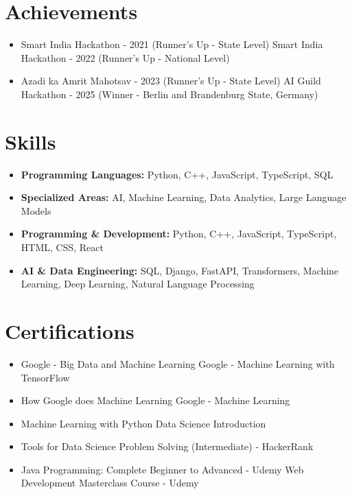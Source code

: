 \documentclass[a4paper,10pt]{article}
\begin{document}
\section*{Achievements}
\begin{itemize}
\item Smart India Hackathon - 2021 (Runner's Up - State Level) \hfill Smart India Hackathon - 2022 (Runner's Up - National Level)
\item Azadi ka Amrit Mahotsav - 2023 (Runner's Up - State Level) \hfill AI Guild Hackathon - 2025 (Winner - Berlin and Brandenburg State, Germany)
\end{itemize}

\section*{Skills}
\begin{itemize}
  \item \textbf{Programming Languages:} Python, C++, JavaScript, TypeScript, SQL
  \item \textbf{Specialized Areas:} AI, Machine Learning, Data Analytics, Large Language Models
  \item \textbf{Programming \& Development:} Python, C++, JavaScript, TypeScript, HTML, CSS, React
  \item \textbf{AI \& Data Engineering:} SQL, Django, FastAPI, Transformers, Machine Learning, Deep Learning, Natural Language Processing
\end{itemize}

\section*{Certifications}
\begin{itemize}
\item Google - Big Data and Machine Learning \hfill Google - Machine Learning with TensorFlow
\item How Google does Machine Learning \hfill Google - Machine Learning
\item Machine Learning with Python \hfill Data Science Introduction
\item Tools for Data Science \hfill Problem Solving (Intermediate) - HackerRank
\item Java Programming: Complete Beginner to Advanced - Udemy \hfill Web Development Masterclass Course - Udemy
\end{itemize}
\end{document}
